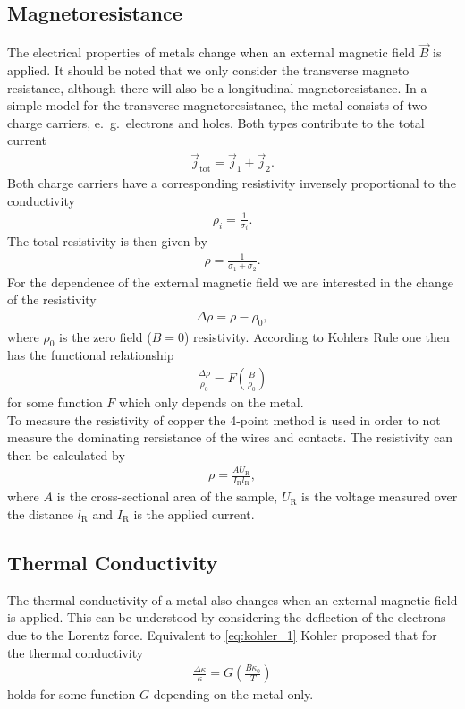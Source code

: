 \subsection{Magnetoresistance}
The electrical properties of metals change when an external magnetic field $\vec{B}$ is applied. It should be noted that we only consider the transverse magneto resistance, although there will also be a longitudinal magnetoresistance. In a simple model for the transverse magnetoresistance, the metal consists of two charge carriers, e.\ g.\ electrons and holes. Both types contribute to the total current
\begin{align*}
    \vec{j}_\mathrm{tot}=\vec{j}_1+\vec{j}_2.
\end{align*}
Both charge carriers have a corresponding resistivity inversely proportional to the conductivity
\begin{align*}
    \rho_i=\frac{1}{\sigma_i}.
\end{align*}
The total resistivity is then given by 
\begin{align*}
    \rho=\frac{1}{\sigma_1+\sigma_2}.
\end{align*}
For the dependence of the external magnetic field we are interested in the change of the resistivity
\begin{align*}
    \Delta \rho=\rho-\rho_0,
\end{align*}
where $\rho_0$ is the zero field ($B=0$) resistivity. According to Kohlers Rule one then has the functional relationship
\begin{align}
    \frac{\Delta \rho}{\rho_0}=F\left( \frac{B}{\rho_0} \right)
    \label{eq:kohler_1}
\end{align}
for some function $F$ which only depends on the metal.\\ 

To measure the resistivity of copper the 4-point method is used in order to not measure the dominating rersistance of the wires and contacts. The resistivity can then be calculated by
\begin{align*}
    \rho=\frac{AU_\mathrm{R}}{I_\mathrm{R}l_\mathrm{R}},
\end{align*}
where $A$ is the cross-sectional area of the sample, $U_\mathrm{R}$ is the voltage measured over the distance $l_\mathrm{R}$ and $I_\mathrm{R}$ is the applied current.

\subsection{Thermal Conductivity}
The thermal conductivity of a metal also changes when an external magnetic field is applied. This can be understood by considering the deflection of the electrons due to the Lorentz force. Equivalent to \ref{eq:kohler_1} Kohler proposed that for the thermal conductivity
\begin{align*}
    \frac{\Delta \kappa}{\kappa}=G \left( \frac{B\kappa_0}{T} \right)
\end{align*}
holds for some function $G$ depending on the metal only.
